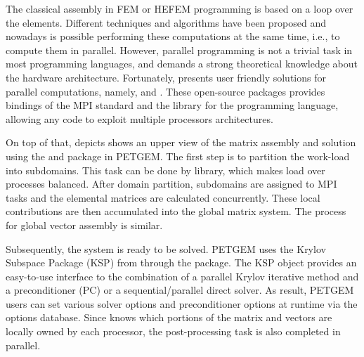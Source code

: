 \documentclass[letterpaper,10pt,english]{sphinxmanual}
\begin{document}
The classical assembly in FEM or HEFEM programming is based on a loop over the
elements. Different techniques and algorithms have been proposed and nowadays is
possible performing these computations at the same time, i.e., to compute them in
parallel. However, parallel programming is not a trivial task in most programming
languages, and demands a strong theoretical knowledge about the hardware
architecture. Fortunately,  presents user
friendly solutions for parallel computations, namely,
 and
 . These open-source
packages provides bindings of the MPI standard and the
 library for the
 programming language, allowing
any  code to exploit multiple processors
architectures.

On top of that, {\hyperref[\detokenize{Manual:figure-7-4}]{}} depicts shows an upper view of the matrix assembly
and solution using the  and
 package in PETGEM. The first
step is to partition the work-load into subdomains. This task can be done
by  library, which makes load over
processes balanced. After domain partition, subdomains are assigned to MPI
tasks and the elemental matrices are calculated concurrently. These local
contributions are then accumulated into the global matrix system. The
process for global vector assembly is similar.

Subsequently, the system is ready to be solved. PETGEM uses the Krylov
Subspace Package (KSP) from  through
the  package. The KSP object
provides an easy-to-use interface to the combination of a parallel Krylov
iterative method and a preconditioner (PC) or a sequential/parallel direct
solver. As result, PETGEM users can set various solver options and
preconditioner options at runtime via the
 options database. Since
 knows which portions of the matrix
and vectors are locally owned by each processor, the post-processing task
is also completed in parallel.
\end{document}
